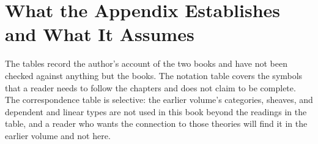 \documentclass[11pt,twoside,openright]{book}
\theoremstyle{plain}
\theoremstyle{definition}
\theoremstyle{remark}
\begin{document}
\section{What the Appendix Establishes and What It Assumes}\label{sec:limits-c}

The tables record the author's account of the two books and have not been checked against anything but the books. The notation table covers the symbols that a reader needs to follow the chapters and does not claim to be complete. The correspondence table is selective: the earlier volume's categories, sheaves, and dependent and linear types are not used in this book beyond the readings in the table, and a reader who wants the connection to those theories will find it in the earlier volume and not here.

\clearpage
{}
\end{document}
